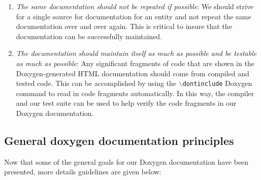 \begin{enumerate}
{}\item\textit{The same documentation should not be repeated if possible}: We
should strive for a single source for documentation for an entity and not
repeat the same documentation over and over again.  This is critical to insure
that the documentation can be successfully maintained.

{}\item\textit{The documentation should maintain itself as much as possible
and be testable as much as possible}: Any significant fragments of code that
are shown in the Doxygen-generated HTML documentation should come from
compiled and tested code.  This can be accomplished by using the
{}\texttt{$\backslash$dontinclude} Doxygen command to read in code fragments
automatically.  In this way, the compiler and our test suite can be used to
help verify the code fragments in our Doxygen documentation.

\end{enumerate}

%
\subsection{General doxygen documentation principles}
%

Now that some of the general goals for our Doxygen documentation have been
presented, more details guidelines are given below:

